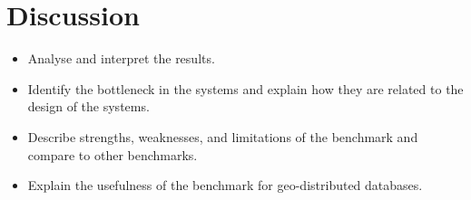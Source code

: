 \section{Discussion}
\label{sec: discussion}

\begin{itemize}
    \item Analyse and interpret the results.
    \item Identify the bottleneck in the systems and explain how they are related to the design of the systems.
    \item Describe strengths, weaknesses, and limitations of the benchmark and compare to other benchmarks.
    \item Explain the usefulness of the benchmark for geo-distributed databases.
\end{itemize}